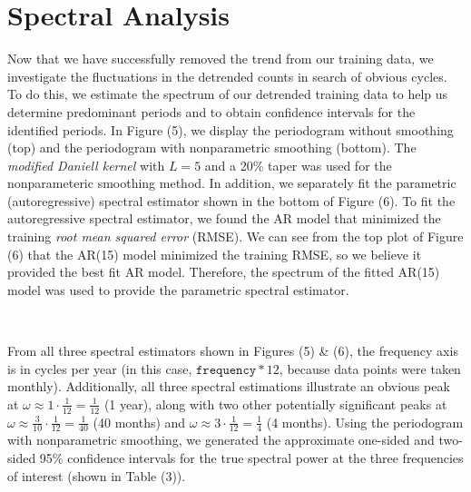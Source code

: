 \documentclass[10pt]{article}
\begin{document}
\section*{Spectral Analysis}

Now that we have successfully removed the trend from our training data, we investigate the fluctuations in the detrended counts in search of obvious cycles. To do this, we estimate the spectrum of our detrended training data to help us determine predominant periods and to obtain confidence intervals for the identified periods. In Figure (5), we display the periodogram without smoothing (top) and the periodogram with nonparametric smoothing (bottom). The \textit{modified Daniell kernel} with $L=5$ and a 20\% taper was used for the nonparameteric smoothing method. In addition, we separately fit the parametric (autoregressive) spectral estimator shown in the bottom of Figure (6). To fit the autoregressive spectral estimator, we found the AR model that minimized the training \textit{root mean squared error} (RMSE). We can see from the top plot of Figure (6) that the AR(15) model minimized the training RMSE, so we believe it provided the best fit AR model. Therefore, the spectrum of the fitted AR(15) model was used to provide the parametric spectral estimator.

\

From all three spectral estimators shown in Figures (5) \& (6), the frequency axis is in cycles per year (in this case, $\texttt{frequency} * 12$, because data points were taken monthly). Additionally, all three spectral estimations illustrate an obvious peak at $\omega \approx 1\cdot\frac{1}{12}=\frac{1}{12}$ (1 year), along with two other potentially significant peaks at $\omega \approx \frac{3}{10}\cdot\frac{1}{12}=\frac{1}{40}$ (40 months) and $\omega \approx 3\cdot\frac{1}{12}=\frac{1}{4}$ (4 months). Using the periodogram with nonparametric smoothing, we generated the approximate one-sided and two-sided 95\% confidence intervals for the true spectral power at the three frequencies of interest (shown in Table (3)).

\
\end{document}
